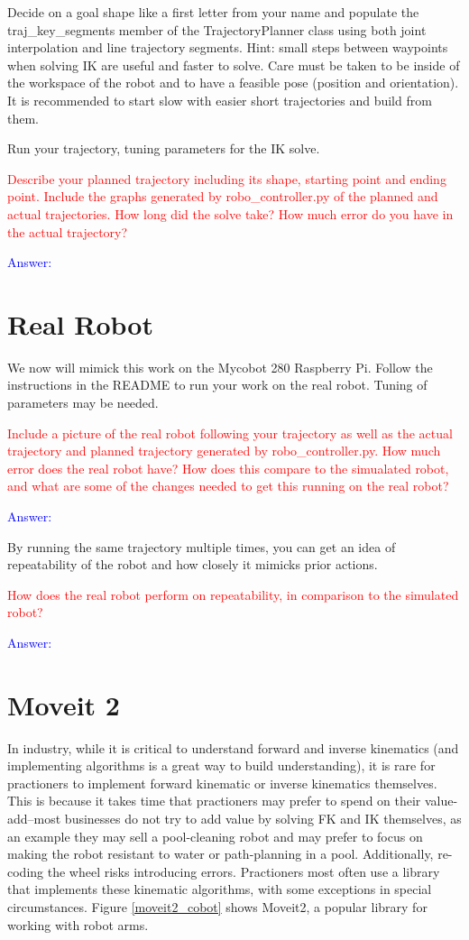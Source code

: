 \documentclass[11pt,a4paper]{article}
\begin{document}
Decide on a goal shape like a first letter from your name and populate the traj\_key\_segments member of the TrajectoryPlanner class using both joint interpolation and line trajectory segments. Hint: small steps between waypoints when solving IK are useful and faster to solve. Care must be taken to be inside of the workspace of the robot and to have a feasible pose (position and orientation). It is recommended to start slow with easier short trajectories and build from them.

Run your trajectory, tuning parameters for the IK solve.

\textcolor{red}{Describe your planned trajectory including its shape, starting point and ending point. Include the graphs generated by robo\_controller.py of the planned and actual trajectories. How long did the solve take? How much error do you have in the actual trajectory?}

\textcolor{blue}{Answer: }


\clearpage
\section{Real Robot}

We now will mimick this work on the Mycobot 280 Raspberry Pi. Follow the instructions in the README to run your work on the real robot. Tuning of parameters may be needed.

\textcolor{red}{Include a picture of the real robot following your trajectory as well as the actual trajectory and planned trajectory generated by robo\_controller.py. How much error does the real robot have? How does this compare to the simualated robot, and what are some of the changes needed to get this running on the real robot?}

\textcolor{blue}{Answer: }

By running the same trajectory multiple times, you can get an idea of repeatability of the robot and how closely it mimicks prior actions.

\textcolor{red}{ How does the real robot perform on repeatability, in comparison to the simulated robot?}

\textcolor{blue}{Answer: }

\clearpage
\section{Moveit 2}

In industry, while it is critical to understand forward and inverse kinematics (and implementing algorithms is a great way to build understanding), it is rare for practioners to implement forward kinematic or inverse kinematics themselves. This is because it takes time that practioners may prefer to spend on their value-add--most businesses do not try to add value by solving FK and IK themselves, as an example they may sell a pool-cleaning robot and may prefer to focus on making the robot resistant to water or path-planning in a pool. Additionally, re-coding the wheel risks introducing errors. Practioners most often use a library that implements these kinematic algorithms, with some exceptions in special circumstances. Figure \ref{moveit2_cobot} shows Moveit2, a popular library for working with robot arms.
\end{document}
